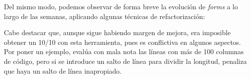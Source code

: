 



Del mismo modo, podemos observar de forma breve la evolución de \emph{forms} a lo largo de las semanas, aplicando algunas técnicas de refactorización:





Cabe destacar que, aunque sigue habiendo margen de mejora, era imposible obtener un 10/10 con esta herramienta, pues es conflictiva en algunos aspectos. Por poner un ejemplo, evalúa con mala nota las líneas con más de 100 columnas de código, pero si se introduce un salto de línea para dividir la longitud, penaliza que haya un salto de línea inapropiado.